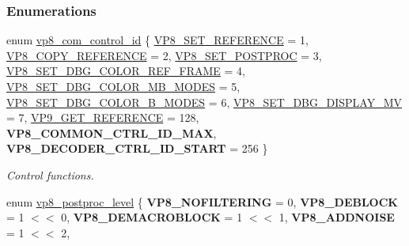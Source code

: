 \subsubsection*{\-Enumerations}
\begin{DoxyCompactItemize}
\item 
enum \hyperlink{group__vp8_ga8cadbc8e0af3da96ef7a2dbd4ed06599}{vp8\-\_\-com\-\_\-control\-\_\-id} \{ \*
\hyperlink{group__vp8_gga8cadbc8e0af3da96ef7a2dbd4ed06599a7abc38d739a5ef49c36d9b2cd88e64a6}{\-V\-P8\-\_\-\-S\-E\-T\-\_\-\-R\-E\-F\-E\-R\-E\-N\-C\-E} =  1, 
\hyperlink{group__vp8_gga8cadbc8e0af3da96ef7a2dbd4ed06599a5375b3ea3a4867d50daee6f5971c7470}{\-V\-P8\-\_\-\-C\-O\-P\-Y\-\_\-\-R\-E\-F\-E\-R\-E\-N\-C\-E} =  2, 
\hyperlink{group__vp8_gga8cadbc8e0af3da96ef7a2dbd4ed06599a43e85c68bc1c1473f4a94b005a59482c}{\-V\-P8\-\_\-\-S\-E\-T\-\_\-\-P\-O\-S\-T\-P\-R\-O\-C} =  3, 
\hyperlink{group__vp8_gga8cadbc8e0af3da96ef7a2dbd4ed06599ab52ea7a97668b603812dfc205b0fd783}{\-V\-P8\-\_\-\-S\-E\-T\-\_\-\-D\-B\-G\-\_\-\-C\-O\-L\-O\-R\-\_\-\-R\-E\-F\-\_\-\-F\-R\-A\-M\-E} =  4, 
\*
\hyperlink{group__vp8_gga8cadbc8e0af3da96ef7a2dbd4ed06599aa0d5c3eaa7cbecaf64403edc8450b060}{\-V\-P8\-\_\-\-S\-E\-T\-\_\-\-D\-B\-G\-\_\-\-C\-O\-L\-O\-R\-\_\-\-M\-B\-\_\-\-M\-O\-D\-E\-S} =  5, 
\hyperlink{group__vp8_gga8cadbc8e0af3da96ef7a2dbd4ed06599ae0052b9dd3c64a4bb822abafb4755a87}{\-V\-P8\-\_\-\-S\-E\-T\-\_\-\-D\-B\-G\-\_\-\-C\-O\-L\-O\-R\-\_\-\-B\-\_\-\-M\-O\-D\-E\-S} =  6, 
\hyperlink{group__vp8_gga8cadbc8e0af3da96ef7a2dbd4ed06599abc6aef0d7e0486d25348de217ad8441d}{\-V\-P8\-\_\-\-S\-E\-T\-\_\-\-D\-B\-G\-\_\-\-D\-I\-S\-P\-L\-A\-Y\-\_\-\-M\-V} =  7, 
\hyperlink{group__vp8_gga8cadbc8e0af3da96ef7a2dbd4ed06599a91e44472b21c720a9a7d087c7226d083}{\-V\-P9\-\_\-\-G\-E\-T\-\_\-\-R\-E\-F\-E\-R\-E\-N\-C\-E} =  128, 
\*
{\bfseries \-V\-P8\-\_\-\-C\-O\-M\-M\-O\-N\-\_\-\-C\-T\-R\-L\-\_\-\-I\-D\-\_\-\-M\-A\-X}, 
{\bfseries \-V\-P8\-\_\-\-D\-E\-C\-O\-D\-E\-R\-\_\-\-C\-T\-R\-L\-\_\-\-I\-D\-\_\-\-S\-T\-A\-R\-T} =  256
 \}
\begin{DoxyCompactList}\small\item\em \-Control functions. \end{DoxyCompactList}\item 
enum \hyperlink{group__vp8_ga99557e20eb37826e6792cd8819121770}{vp8\-\_\-postproc\-\_\-level} \{ \*
{\bfseries \-V\-P8\-\_\-\-N\-O\-F\-I\-L\-T\-E\-R\-I\-N\-G} =  0, 
{\bfseries \-V\-P8\-\_\-\-D\-E\-B\-L\-O\-C\-K} =  1 $<$$<$ 0, 
{\bfseries \-V\-P8\-\_\-\-D\-E\-M\-A\-C\-R\-O\-B\-L\-O\-C\-K} =  1 $<$$<$ 1, 
{\bfseries \-V\-P8\-\_\-\-A\-D\-D\-N\-O\-I\-S\-E} =  1 $<$$<$ 2, 
$$
\end{DoxyCompactItemize}
